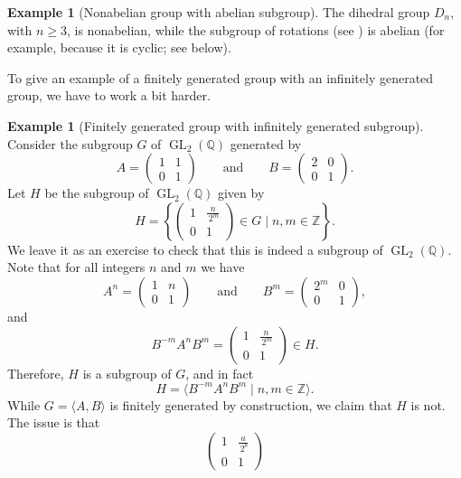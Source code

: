 \documentclass[12pt]{report}
\numberwithin{equation}{section}
\numberwithin{theorem}{chapter}
\theoremstyle{definition}
\newtheorem{example}[theorem]{Example}
\newtheorem*{basic properties}{Basic Properties}
\newtheorem*{Important Remark}{Important Remark}
\DeclareMathOperator{\GL}{GL}
\newcommand{\Z}{\mathbb{Z}}
\newcommand{\Q}{\mathbb{Q}}
\begin{document}
\begin{example}[Nonabelian group with abelian subgroup]\label{nonabelian group with abelian subgroup}
	The dihedral group $D_n$, with $n \geqslant 3$, is nonabelian, while the subgroup of rotations (see ) is abelian (for example, because it is cyclic; see  below).
\end{example}

To give an example of a finitely generated group with an infinitely generated group, we have to work a bit harder.

\begin{example}[Finitely generated group with infinitely generated subgroup]\label{fg group with infinitely generated subgroup}
	Consider the subgroup $G$ of $\GL_2(\Q)$ generated by
	$$A = \begin{pmatrix}
		1 & 1 \\ 0 & 1
	\end{pmatrix} \qquad \textrm{and} \qquad B = \begin{pmatrix}
		2 & 0 \\ 0 & 1
	\end{pmatrix}.$$
	Let $H$ be the subgroup of $\GL_2(\Q)$ given by
	$$H = \left\lbrace \begin{pmatrix} 1 & \frac{n}{\, 2^m} \\ 0 & 1 \end{pmatrix} \in G \displaystyle\mid n, m \in \Z \right\rbrace.$$
	We leave it as an exercise to check that this is indeed a subgroup of $\GL_2(\Q)$. Note that for all integers $n$ and $m$ we have
	$$A^n = \begin{pmatrix} 1 & n \\ 0 & 1 \end{pmatrix} \qquad \textrm{and} \qquad B^m = \begin{pmatrix} 2^m & 0 \\ 0 & 1 \end{pmatrix},$$
	and
	$$B^{-m} A^n B^m = \begin{pmatrix} 1 & \frac{n}{\, 2^m} \\ 0 & 1 \end{pmatrix} \in H.$$
Therefore, $H$ is a subgroup of $G$, and in fact
$$H = \langle B^{-m} A^n B^m \mid n, m \in \Z \rangle.$$
While $G = \langle A, B \rangle$ is finitely generated by construction, we claim that $H$ is not. The issue is that
$$\begin{pmatrix} 1 & \frac{a}{\, 2^b} \\ 0 & 1 \end{pmatrix} 
$$
\end{example}
\end{document}
